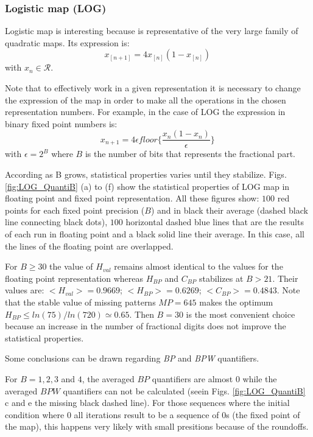 \subsubsection{Logistic map (LOG)} \label{subsubsec:log}

Logistic map is interesting because is representative of the very large family of quadratic maps.
Its expression is:
\begin{equation}\label{eq:logimap}
 x_{[n+1]}=4x_{[n]}(1-x_{[n]}) \,
\end{equation}
with $x_n\in\mathcal{R}$.

Note that to effectively work in a given representation it is necessary to change the expression of the map in order to make all the operations in the chosen representation numbers. For example, in the case of LOG the expression in binary fixed point numbers is:
\begin{equation}\label{eq:logimapB2}
x_{n+1}=4 \epsilon floor\{\frac{x_n(1-x_n)}{\epsilon}\} \,
\end{equation}
with $\epsilon = 2^B$ where $B$ is the number of bits that represents the fractional part.

According as B grows, statistical properties varies until they stabilize.
Figs. \ref{fig:LOG_QuantiB} (a) to (f) show the statistical properties of LOG map in floating point and fixed point representation.
All these figures show: $100$ red points for each fixed point precision ($B$) and in black their average (dashed black line connecting black dots), $100$ horizontal dashed blue lines that are the results of each run in floating point and a black solid line their average.
In this case, all the lines of the floating point are overlapped.

For $B\geq 30$ the value of $H_{val}$ remains almost identical to the values for the floating point representation whereas $H_{BP}$ and $C_{BP}$ stabilizes at $B>21$.
Their values are: $<H_{val}>=0.9669$; $<H_{BP}>=0.6269$; $<C_{BP}>=0.4843$.
Note that the stable value of missing patterns $MP=645$ makes the optimum $H_{BP} \leq ln(75)/ln(720) \simeq 0.65$.
Then $B=30$ is the most convenient choice because an increase in the number of fractional digits does not improve the statistical properties.

Some conclusions can be drawn regarding \textit{BP} and \textit{BPW} quantifiers.

For $B=1, 2, 3$ and $4$, the averaged $BP$ quantifiers are almost $0$ while the averaged $BPW$ quantifiers can not be calculated (seein Figs. \ref{fig:LOG_QuantiB} c and e the missing black dashed line).
For those sequences where the initial condition where $0$ all iterations result to be a sequence of $0$s (the fixed point of the map), this happens very likely with small presitions because of the roundoffs.

